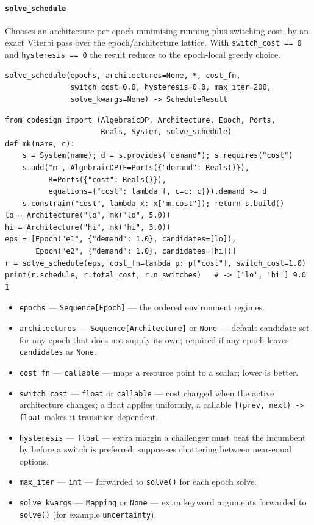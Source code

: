 \documentclass[11pt,a4paper]{article}
\begin{document}
\paragraph{\texttt{solve\_schedule}}\label{ref:temporal:solve_schedule}
Chooses an architecture per epoch minimising running plus switching cost,
by an exact Viterbi pass over the epoch/architecture lattice. With
\texttt{switch\_cost == 0} and \texttt{hysteresis == 0} the result reduces
to the epoch-local greedy choice.
\begin{lstlisting}
solve_schedule(epochs, architectures=None, *, cost_fn,
               switch_cost=0.0, hysteresis=0.0, max_iter=200,
               solve_kwargs=None) -> ScheduleResult
\end{lstlisting}
\begin{lstlisting}
from codesign import (AlgebraicDP, Architecture, Epoch, Ports,
                      Reals, System, solve_schedule)
def mk(name, c):
    s = System(name); d = s.provides("demand"); s.requires("cost")
    s.add("m", AlgebraicDP(F=Ports({"demand": Reals()}),
          R=Ports({"cost": Reals()}),
          equations={"cost": lambda f, c=c: c})).demand >= d
    s.constrain("cost", lambda x: x["m.cost"]); return s.build()
lo = Architecture("lo", mk("lo", 5.0))
hi = Architecture("hi", mk("hi", 3.0))
eps = [Epoch("e1", {"demand": 1.0}, candidates=[lo]),
       Epoch("e2", {"demand": 1.0}, candidates=[hi])]
r = solve_schedule(eps, cost_fn=lambda p: p["cost"], switch_cost=1.0)
print(r.schedule, r.total_cost, r.n_switches)   # -> ['lo', 'hi'] 9.0 1
\end{lstlisting}
\begin{itemize}[nosep]
  \item \texttt{epochs} --- \texttt{Sequence[Epoch]} --- the ordered
    environment regimes.
  \item \texttt{architectures} --- \texttt{Sequence[Architecture]} or
    \texttt{None} --- default candidate set for any epoch that does not
    supply its own; required if any epoch leaves \texttt{candidates} as
    \texttt{None}.
  \item \texttt{cost\_fn} --- \texttt{callable} --- maps a resource point to
    a scalar; lower is better.
  \item \texttt{switch\_cost} --- \texttt{float} or \texttt{callable} ---
    cost charged when the active architecture changes; a float applies
    uniformly, a callable \texttt{f(prev, next) -> float} makes it
    transition-dependent.
  \item \texttt{hysteresis} --- \texttt{float} --- extra margin a challenger
    must beat the incumbent by before a switch is preferred; suppresses
    chattering between near-equal options.
  \item \texttt{max\_iter} --- \texttt{int} --- forwarded to \texttt{solve()}
    for each epoch solve.
  \item \texttt{solve\_kwargs} --- \texttt{Mapping} or \texttt{None} ---
    extra keyword arguments forwarded to \texttt{solve()} (for example
    \texttt{uncertainty}).
\end{itemize}
\end{document}

